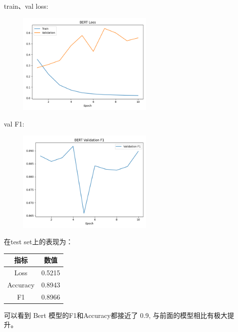 \documentclass{article}
\begin{document}
\FloatBarrier

train、val loss:
\begin{figure}[h]
    \centering
    \includegraphics[width=0.6\textwidth]{../results/bert_loss.png}
\end{figure}

\FloatBarrier

val F1:
\begin{figure}[htbp]
    \centering
    \includegraphics[width=0.6\textwidth]{../results/bert_f1.png}
\end{figure}

\FloatBarrier

在test set上的表现为：

\begin{table}[H]
    \centering
    \begin{tabular}{|c|c|}
        \hline 
        {\bf 指标} & {\bf 数值} \\
        \hline
        Loss & 0.5215 \\
        \hline 
        Accuracy & 0.8943 \\
        \hline
        F1 & 0.8966 \\
        \hline
    \end{tabular}
\end{table}

可以看到 Bert 模型的F1和Accuracy都接近了 0.9, 与前面的模型相比有极大提升。
\end{document}
